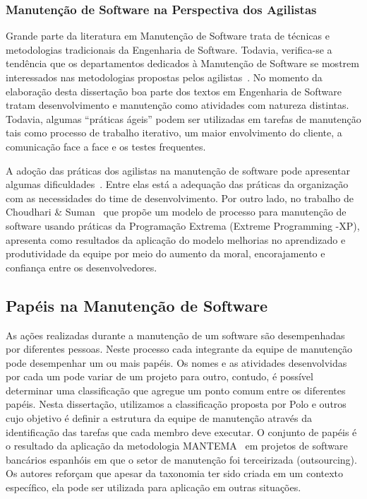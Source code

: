 \subsubsection{Manutenção de Software na Perspectiva dos Agilistas}
\label{sub:manutenção_de_software_com_método_dos_agilistas}

Grande parte da literatura em Manutenção de Software trata de técnicas e
metodologias tradicionais da Engenharia de Software. Todavia, verifica-se a
tendência que os departamentos dedicados à Manutenção de Software se mostrem
interessados nas metodologias propostas pelos agilistas~\cite{Heeager2015}.  No
momento da elaboração desta dissertação boa parte dos textos em Engenharia de
Software tratam desenvolvimento e manutenção como atividades com natureza
distintas. Todavia, algumas ``práticas ágeis'' podem ser utilizadas em tarefas
de manutenção tais como processo de trabalho iterativo, um maior envolvimento do
cliente, a comunicação face a face e os testes frequentes.

A adoção das práticas dos agilistas na manutenção de software pode apresentar
algumas dificuldades~\cite{1402140}. Entre elas está a adequação das práticas da
organização com as necessidades do time de desenvolvimento. Por outro lado, no
trabalho de Choudhari \& Suman~\cite{Choudhari:2014:EIM:2557833.2557845} que
propõe um modelo de processo para manutenção de software usando práticas da
Programação Extrema (Extreme Programming \@-\@ XP), apresenta como resultados da
aplicação do modelo melhorias no aprendizado e produtividade da equipe por meio
do aumento da moral, encorajamento e confiança entre os desenvolvedores.

\subsection{Papéis na Manutenção de Software}
\label{subsec:man_visao_geral_papeis_na_manutencao_de_software}

As ações realizadas durante a manutenção de um software são desempenhadas por
diferentes pessoas. Neste processo cada integrante da equipe de manutenção pode
desempenhar um ou mais papéis. Os nomes e as atividades desenvolvidas por cada
um pode variar de um projeto para outro, contudo, é possível determinar uma
classificação que agregue um ponto comum entre os diferentes papéis. Nesta
dissertação, utilizamos a classificação proposta por Polo e
outros~\cite{Polo1999} cujo objetivo é definir a estrutura da equipe de
manutenção através da identificação das tarefas que cada membro deve executar.
O conjunto de papéis é o resultado da aplicação da metodologia
MANTEMA~\cite{756695} em projetos de software bancários espanhóis em que o setor
de manutenção foi terceirizada (outsourcing). Os autores reforçam que apesar da
taxonomia ter sido criada em um contexto específico, ela pode ser utilizada para
aplicação em outras situações.


